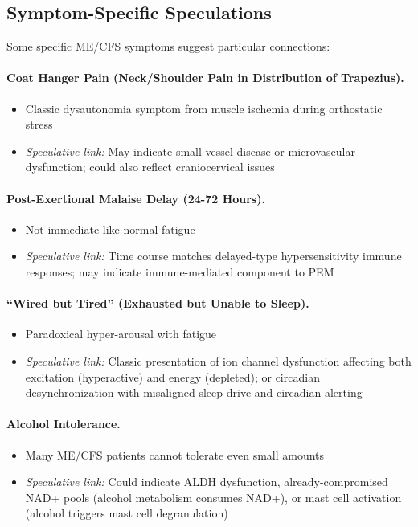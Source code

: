 \subsection{Symptom-Specific Speculations}

Some specific ME/CFS symptoms suggest particular connections:

\paragraph{Coat Hanger Pain (Neck/Shoulder Pain in Distribution of Trapezius).}
\begin{itemize}
    \item Classic dysautonomia symptom from muscle ischemia during orthostatic stress
    \item \textit{Speculative link:} May indicate small vessel disease or microvascular dysfunction; could also reflect craniocervical issues
\end{itemize}

\paragraph{Post-Exertional Malaise Delay (24-72 Hours).}
\begin{itemize}
    \item Not immediate like normal fatigue
    \item \textit{Speculative link:} Time course matches delayed-type hypersensitivity immune responses; may indicate immune-mediated component to PEM
\end{itemize}

\paragraph{``Wired but Tired'' (Exhausted but Unable to Sleep).}
\begin{itemize}
    \item Paradoxical hyper-arousal with fatigue
    \item \textit{Speculative link:} Classic presentation of ion channel dysfunction affecting both excitation (hyperactive) and energy (depleted); or circadian desynchronization with misaligned sleep drive and circadian alerting
\end{itemize}

\paragraph{Alcohol Intolerance.}
\begin{itemize}
    \item Many ME/CFS patients cannot tolerate even small amounts
    \item \textit{Speculative link:} Could indicate ALDH dysfunction, already-compromised NAD+ pools (alcohol metabolism consumes NAD+), or mast cell activation (alcohol triggers mast cell degranulation)
\end{itemize}

